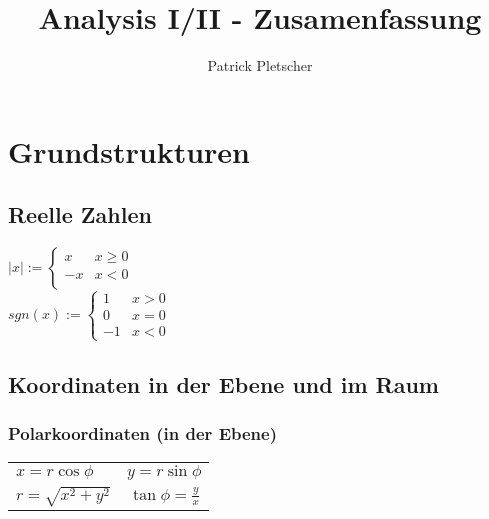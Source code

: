 \documentclass[10pt, a4paper, twocolumn]{scrartcl}
\title{Analysis I/II - Zusamenfassung}
\author{Patrick Pletscher}
\begin{document}
\maketitle

\section{Grundstrukturen}

\subsection{Reelle Zahlen}
$
\mid x \mid := \left\{
                 \begin{array}{ll}
                    x    & \mbox{$x \geq 0$} \\
            -x   & \mbox{$x < 0$} \\
         \end{array}
        \right.
$\\
$
 sgn(x) := \left\{
                 \begin{array}{lll}
                    1    & \mbox{$x > 0$} \\
            0    & \mbox{$x = 0$} \\
            -1   & \mbox{$x < 0$}
         \end{array}
        \right.
$

\subsection{Koordinaten in der Ebene und im Raum}

\subsubsection{Polarkoordinaten (in der Ebene)}
\begin{tabular}[ht]{lc}
$x=r\cos\phi$       &  $y=r\sin\phi$\\
$r=\sqrt{x^2+y^2}$  &  $\tan\phi=\frac{y}{x}$\\
\end{tabular}
\end{document}
